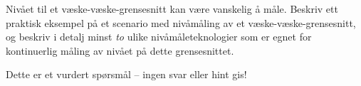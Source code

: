 

Nivået til et væske-væske-grensesnitt kan være vanskelig å måle.  Beskriv ett praktisk eksempel på et scenario med nivåmåling av et væske-væske-grensesnitt, og beskriv i detalj minst {\it to} ulike nivåmåleteknologier som er egnet for kontinuerlig måling av nivået på dette grensesnittet.

\vfil 

\eject






Dette er et vurdert spørsmål -- ingen svar eller hint gis!









